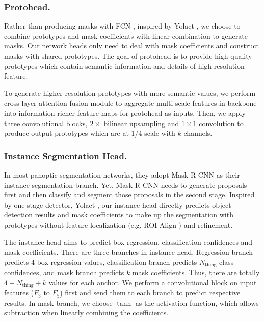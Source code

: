 \documentclass[runningheads]{llncs}
\begin{document}
\subsubsection{Protohead.}
Rather than producing masks with FCN \cite{Long2015}, inspired by Yolact \cite{Bolya}, we choose to combine prototypes and mask coefficients with linear combination to generate masks. Our network heads only need to deal with mask coefficients and construct masks with shared prototypes. The goal of protohead is to provide high-quality prototypes which contain semantic information and details of high-resolution feature.



To generate higher resolution prototypes with more semantic values, we perform cross-layer attention fusion module to aggregate multi-scale features in backbone into information-richer feature maps for protohead as inputs. 
Then, we apply three convolutional blocks, $2\times$ bilinear upsampling and $1\times1$ convolution to produce output prototypes which are at 1/4 scale with $k$ channels. 






\subsubsection{Instance Segmentation Head.}

In most panoptic segmentation networks, they adopt Mask R-CNN \cite{He2017} as their instance segmentation branch. Yet, Mask R-CNN \cite{He2017} needs to generate proposals first and then classify and segment those proposals in the second stage. Inspired by one-stage detector, Yolact \cite{Bolya}, our instance head directly predicts object detection results and mask coefficients to make up the segmentation with prototypes without feature localization (e.g. ROI Align \cite{He2017}) and refinement.

The instance head aims to predict box regression, classification confidences and mask coefficients. There are three branches in instance head. Regression branch predicts 4 box regression values, classification branch predicts $N_{\text{thing}}$ class confidences, and mask branch predicts $k$ mask coefficients. Thus, there are totally $4+N_{\text{thing}}+k$ values for each anchor. We perform a convolutional block on input features ($F_3$ to $F_5$) first and send them to each branch to predict respective results. In mask branch, we choose $\tanh$ as the activation function, which allows subtraction when linearly combining the coefficients.
\end{document}

